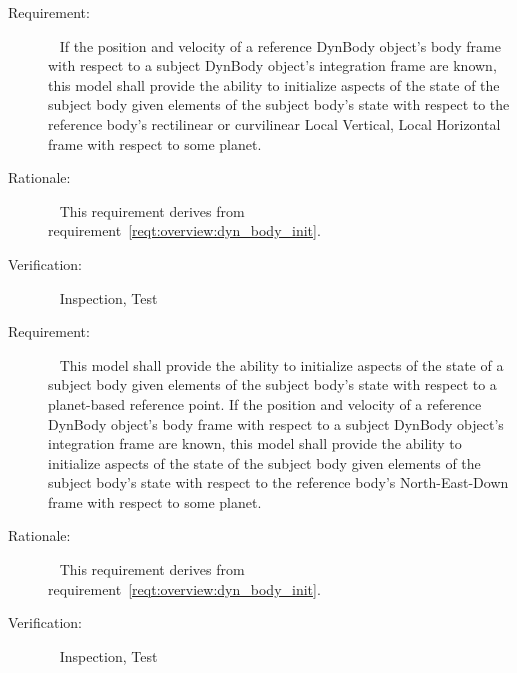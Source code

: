 \label{reqt:DynBodyInit:LVLH}
\begin{description}
  \item[Requirement:]\ \newline
    If the position and velocity of a reference DynBody object's body frame
    with respect to a subject DynBody object's integration frame are known,
    this model shall provide the ability to initialize
    aspects of the state of the subject body
    given elements of the subject body's state
    with respect to the reference body's
    rectilinear or curvilinear Local Vertical, Local Horizontal frame
    with respect to some planet.
  \item[Rationale:]\ \newline
    This requirement derives from
    requirement~\ref{reqt:overview:dyn_body_init}.
  \item[Verification:]\ \newline
    Inspection, Test
\end{description}

\label{reqt:DynBodyInit:NED}
\begin{description}
  \item[Requirement:]\ \newline
  \label{reqt:DynBodyInit:reference_NED}
    This model shall provide the ability to initialize
    aspects of the state of a subject body
    given elements of the subject body's state
    with respect to a planet-based reference point.
  \label{reqt:DynBodyInit:relative_NED}
    If the position and velocity of a reference DynBody object's body frame
    with respect to a subject DynBody object's integration frame are known,
    this model shall provide the ability to initialize
    aspects of the state of the subject body
    given elements of the subject body's state
    with respect to the reference body's
    North-East-Down frame
    with respect to some planet.
  \item[Rationale:]\ \newline
    This requirement derives from
    requirement~\ref{reqt:overview:dyn_body_init}.
  \item[Verification:]\ \newline
    Inspection, Test
\end{description}

